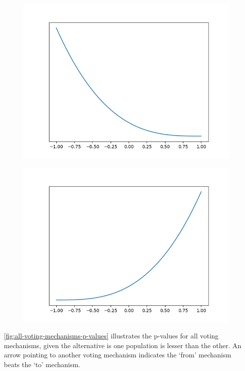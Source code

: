 \begin{figure}[!htbp]
    \centering
    \includegraphics[scale=0.5]
    {./content/figures/dists/beta_1_4}
    \caption{}
    \label{fig:beta-1-4}
\end{figure}

\begin{figure}[!htbp]
    \centering
    \includegraphics[scale=0.5]
    {./content/figures/dists/beta_4_1}
    \caption{}
    \label{fig:beta-4-1}
\end{figure}

\autoref{fig:all-voting-mechanisms-p-values} illustrates the p-values for all voting
mechanisms, given the alternative is one population is lesser than the other.
An arrow pointing to another voting mechanism indicates the `from' mechanism beats
the `to' mechanism.

